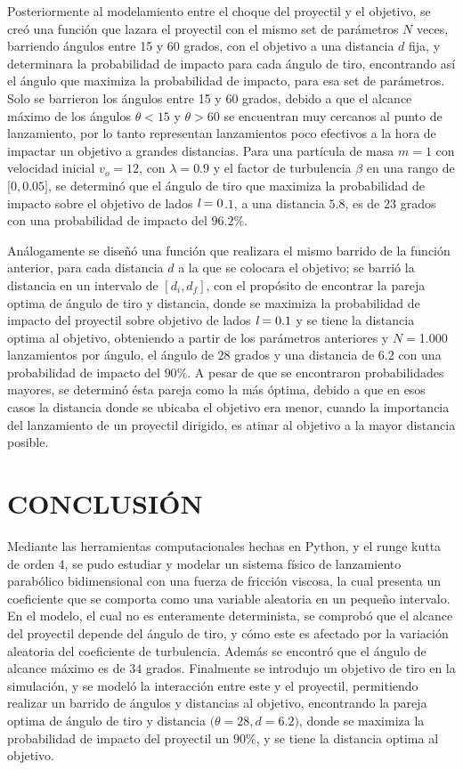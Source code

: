 \documentclass[11pt,letterpaper,twocolumn]{article}
\begin{document}
\par 
Posteriormente al modelamiento entre el choque del proyectil y el objetivo, se creó una función que lazara el proyectil con el mismo set de parámetros $N$ veces, barriendo ángulos entre 15 y 60 grados, con el objetivo a una distancia $d$ fija, y determinara la probabilidad de impacto para cada ángulo de tiro, encontrando así el ángulo que maximiza la probabilidad de impacto, para esa set de parámetros. Solo se barrieron los ángulos entre 15  y 60 grados, debido a que el alcance máximo de los ángulos $\theta < 15$ y $\theta > 60$ se encuentran muy cercanos al punto de lanzamiento, por lo tanto representan lanzamientos poco efectivos a la hora de impactar un objetivo a grandes distancias. Para una partícula de masa $m=1$ con velocidad inicial $v_{o}=12$, con $\lambda=0.9$ y el factor de turbulencia $\beta$ en una rango de $[0,0$.$05]$, se determinó que el ángulo de tiro que maximiza la probabilidad de impacto sobre el objetivo de lados $\emph{l}=0$.$1$, a una distancia $5$.$8$, es de $23$ grados con una probabilidad de impacto del $96.2\%$.\\
\par 
Análogamente se diseñó  una función que realizara el mismo barrido de la función anterior, para cada distancia $d$ a la que se colocara el objetivo; se barrió la distancia en un intervalo de $[d_{i},d_{f}]$, con el propósito de encontrar la pareja optima de ángulo de tiro y distancia, donde se maximiza la probabilidad de impacto del proyectil sobre objetivo de lados $\emph{l}=0.1$ y se tiene la distancia optima al objetivo, obteniendo a partir de los parámetros anteriores y $N=$1.000 lanzamientos por ángulo, el ángulo de $28$ grados y una distancia de $6.2$ con una probabilidad de impacto del $90\%$. A pesar de que se encontraron probabilidades mayores, se determinó ésta pareja como la más óptima, debido a que en esos casos la distancia donde se ubicaba el objetivo era menor, cuando la importancia del lanzamiento de un proyectil dirigido, es atinar al objetivo a la mayor distancia posible. 
 
\section*{\normalsize{CONCLUSIÓN}}
Mediante las herramientas computacionales hechas en Python, y el runge kutta de orden 4, se pudo estudiar y modelar un sistema físico de lanzamiento parabólico bidimensional con una fuerza de fricción viscosa, la cual presenta un coeficiente que se comporta como una variable aleatoria en un pequeño intervalo. En el modelo, el cual no es enteramente determinista, se comprobó que el alcance del proyectil depende del ángulo de tiro, y cómo este es afectado por la variación aleatoria del coeficiente de turbulencia. Además se encontró que el ángulo de alcance máximo es de $34$ grados. Finalmente se introdujo un objetivo de tiro en la simulación, y se modeló la interacción entre este y el proyectil, permitiendo realizar un barrido de ángulos y distancias al objetivo, encontrando la pareja optima de ángulo de tiro y distancia $(\theta=28,d=6$.$2)$, donde se maximiza la probabilidad de impacto del proyectil un $90\%$, y se tiene la distancia optima al objetivo.  
\end{document}

